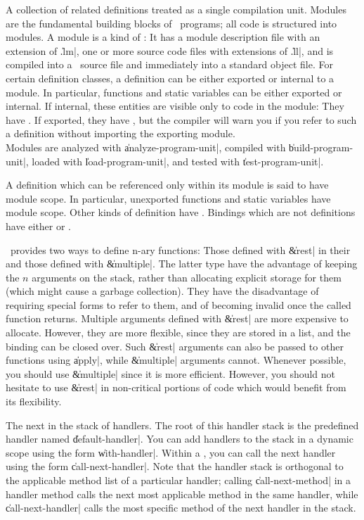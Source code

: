 \begin{description}
	{A collection of related definitions treated as a single
	compilation unit.  Modules are the fundamental building blocks
	of \Talk\ programs; all code is structured into modules.  A
	module is a kind of : It has a module
	description file with an extension of \|.lm|, one or more
	source code files with extensions of \|.ll|, and is compiled
	into a \langc\ source file and immediately into a standard
	object file.  For certain definition classes, a definition can
	be either exported or internal to a module.  In particular,
	functions and static variables can be either exported or
	internal.  If internal, these entities are visible only to
	code in the module: They have .  If
	exported, they have , but the compiler will
	warn you if you refer to such a definition without importing
	the exporting module. \\
	Modules are analyzed with \|analyze-program-unit|, compiled
	with \|build-program-unit|, loaded with \|load-program-unit|,
	and tested with \|test-program-unit|.}

	{A definition which can be referenced only within its module
	is said to have module scope.  In particular, unexported
	functions and static variables have module scope.  Other kinds
	of definition have .  Bindings which are
	not definitions have either  or
	.}
	
	{\Talk\ provides two ways to define n-ary functions:  Those
	defined with \|\&rest| in their  and those
	defined with \|\&multiple|.  The latter type have the advantage
	of keeping the $n$ arguments on the stack, rather than
	allocating explicit storage for them (which might cause a
	garbage collection).  They have the disadvantage of requiring
	special forms to refer to them, and of becoming invalid once
	the called function returns.  Multiple arguments defined with
	\|\&rest| are more expensive to allocate.  However, they are
	more flexible, since they are stored in a list, and the
	binding can be closed over.  Such \|\&rest| arguments can also
	be passed to other functions using \|apply|, while
	\|\&multiple| arguments cannot.  Whenever possible, you should
	use \|\&multiple| since it is more efficient.  However, you
	should not hesitate to use \|\&rest| in non-critical portions
	of code which would benefit from its flexibility.}

	{The next   in the stack of
	handlers.  The root of this handler stack is the predefined
	handler named \|default-handler|.  You can add handlers to the
	stack in a dynamic scope using the form \|with-handler|.
	Within a , you can call the next handler
	using the form \|call-next-handler|.  Note that the handler
	stack is orthogonal to the applicable method list of a
	particular handler; calling \|call-next-method| in a handler
	method calls the next most applicable method in the same
	handler, while \|call-next-handler| calls the most specific
	method of the next handler in the stack.}


\end{description}
